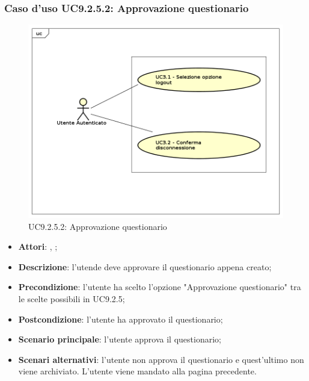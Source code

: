 			\subsubsection{Caso d'uso UC9.2.5.2: Approvazione questionario}
			\label{UC9.2.5.2}
			\begin{figure}[h]
				\centering
			\includegraphics[scale=0.5,keepaspectratio]{UML/UC9.png}
				\caption{UC9.2.5.2: Approvazione questionario}
			\end{figure}
			\FloatBarrier
			\begin{itemize}
				\item \textbf{Attori}: \uau, \uaupro;
				\item \textbf{Descrizione}: l'utende deve approvare il questionario appena creato;
				\item \textbf{Precondizione}: l'utente ha scelto l'opzione "Approvazione questionario" tra le scelte possibili in UC9.2.5; 
				\item \textbf{Postcondizione}: l'utente ha approvato il questionario;
				\item \textbf{Scenario principale}: l'utente approva il questionario;
				\item \textbf{Scenari alternativi}: l'utente non approva il questionario e quest'ultimo non viene archiviato. L'utente viene mandato alla pagina precedente.
			\end{itemize}
	 
	
	